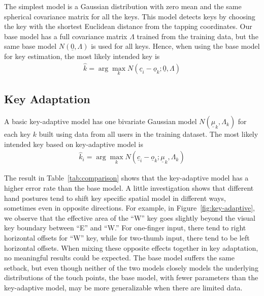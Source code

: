 \documentclass{sigchi}
\begin{document}
The simplest model is a Gaussian distribution with zero mean and the same spherical covariance matrix for all the keys. This model detects keys by choosing the key with the shortest Euclidean distance from the tapping coordinates.
Our base model has a full covariance matrix $\Lambda$ trained from the
training data, but the same base model $N(\underline 0, \Lambda)$ is used for all keys. Hence, when using the base model for key estimation, the most likely intended key is
\begin{align}          
\hat k = \arg\max_k N(\underline c_i - \underline o_k; \underline 0, \Lambda)
\end{align}


\subsection{Key Adaptation}
A basic key-adaptive model has one bivariate Gaussian model
$N(\underline\mu_k, \Lambda_k)$ for each key $k$ built  using data from all users in the training dataset. The most likely intended key based on key-adaptive model is
\begin{align}          
\hat k_i = \arg\max_k N(\underline c_i - \underline o_k; \underline \mu_k, \Lambda_k)
\end{align}

The result in Table~\ref{tab:comparison} shows that the key-adaptive
model has a higher error rate than the base model. A little investigation shows that different hand
postures tend to shift key specific spatial model in different ways, sometimes even in opposite
directions. For example, in Figure~\ref{fig:key-adaptive}, we observe that the
effective area of the ``W'' key goes slightly beyond the visual key boundary between ``E''
and ``W.'' For one-finger input, there tend to right horizontal offsets for ``W'' key,
while for two-thumb input, there tend to be left horizontal offsets. When mixing
these opposite effects together in key adaptation, no meaningful results could
be expected. The base model suffers the same setback, but even though neither
of the two models closely models the underlying distributions of the touch points, the base model, with fewer parameters than the key-adaptive model, may be more generalizable when there are limited data.
\end{document}
